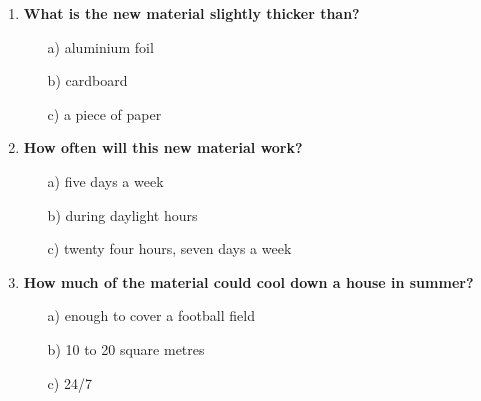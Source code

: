 \begin{enumerate}
      \item \textbf{What is the new material slightly thicker than?}
            \begin{enumerate}
                  \item[a)] aluminium foil
                  \item[b)] cardboard
                  \item[c)] a piece of paper
            \end{enumerate}
      \item \textbf{How often will this new material work?}
            \begin{enumerate}
                  \item[a)] five days a week
                  \item[b)] during daylight hours
                  \item[c)] twenty four hours, seven days a week
            \end{enumerate}
      \item \textbf{How much of the material could cool down a house in summer?}
            \begin{enumerate}
                  \item[a)] enough to cover a football field
                  \item[b)] 10 to 20 square metres
                  \item[c)] 24/7
            \end{enumerate}
\end{enumerate}

